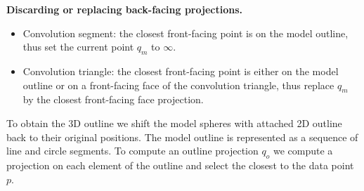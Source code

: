 
\textbf{Discarding or replacing back-facing projections.}
\begin{itemize}
	\item Convolution segment: the closest front-facing point is on the model outline, thus set the current point $q_m$ to $\infty$.
	\item Convolution triangle: the closest front-facing point is either on the model outline or on a front-facing face of the convolution triangle, thus replace $q_m$ by the closest front-facing face projection.
\end{itemize}

To obtain the 3D outline we shift the model spheres with attached 2D outline back to their original positions. The model outline is represented as a sequence of line and circle segments. To compute an outline projection $q_o$ we compute a projection on each element of the outline and select the closest to the data point $p$.




